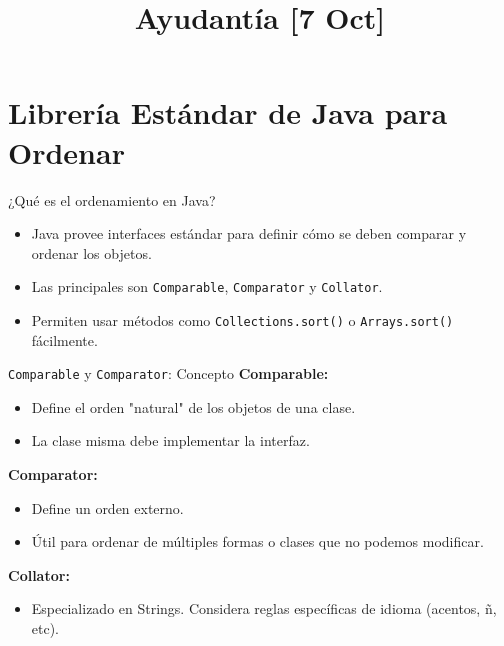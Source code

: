 \documentclass{beamer}
\title{Ayudantía [7 Oct]}
\date{}
\author{}
\begin{document}
\begin{frame}
  \titlepage
\end{frame}

\section{Librería Estándar de Java para Ordenar}

\begin{frame}{¿Qué es el ordenamiento en Java?}
  \begin{itemize}
      \item Java provee interfaces estándar para definir cómo se deben comparar y ordenar los objetos.
      \item Las principales son \texttt{Comparable}, \texttt{Comparator} y \texttt{Collator}.
      \item Permiten usar métodos como \texttt{Collections.sort()} o \texttt{Arrays.sort()} fácilmente.
  \end{itemize}
  \vspace{0.5cm}
  \centering
\end{frame}

\begin{frame}{\texttt{Comparable} y \texttt{Comparator}: Concepto}
  \textbf{Comparable:}
  \begin{itemize}
      \item Define el orden "natural" de los objetos de una clase.
      \item La clase misma debe implementar la interfaz.
  \end{itemize}
  \vspace{0.3cm}
  \textbf{Comparator:}
  \begin{itemize}
      \item Define un orden externo.
      \item Útil para ordenar de múltiples formas o clases que no podemos modificar.
  \end{itemize}
  \vspace{0.3cm}
  \textbf{Collator:}
  \begin{itemize}
      \item Especializado en Strings. Considera reglas específicas de idioma (acentos, ñ, etc).
  \end{itemize}
\end{frame}
\end{document}
